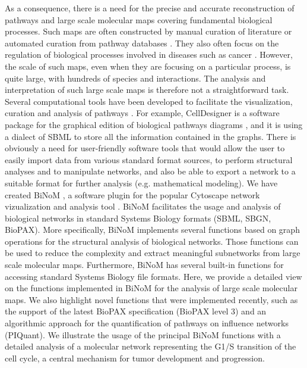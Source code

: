 \documentclass[10pt]{bmc_article}
\newenvironment{bmcformat}{\baselineskip20pt\sloppy\setboolean{publ}{false}}{\baselineskip20pt\sloppy}
\begin{document}
\begin{bmcformat}
As a consequence, there is a need for the precise and accurate reconstruction of
pathways and large scale molecular maps covering fundamental biological
processes. Such maps are often constructed by manual curation of literature or
automated curation from pathway databases \cite{bauer2009pathway}. They also
often focus on the regulation of biological processes involved in diseases such
as cancer \cite{oda2005comprehensive, oda2006comprehensive,
calzone2008comprehensive, caron2010comprehensive}. However, the scale of such
maps, even when they are focusing on a particular process, is quite large, with
hundreds of species and interactions. The analysis and interpretation of such
large scale maps is therefore not a straightforward task. Several computational
tools have been developed to facilitate the visualization, curation and analysis
of pathways \cite{adriaens2008public}. For example, CellDesigner is a software package
for the graphical edition of biological pathways diagrams
\cite{funahashi2003celldesigner}, and it is using a dialect
of SBML to store all the information contained in the graphs. There is obviously
a need for user-friendly software tools that would allow the user to easily
import data from various standard format sources, to perform structural analyses
and to manipulate networks, and also be able to export a network to a suitable
format for further analysis (e.g. mathematical modeling). We have created
BiNoM \cite{zinovyev2008binom}, a software plugin for the popular Cytoscape
network vizualization and analysis tool \cite{cline2007integration}. BiNoM
facilitates the usage and analysis of biological networks in standard Systems
Biology formats (SBML, SBGN, BioPAX). More specifically, BiNoM implements
several functions based on graph operations for the structural analysis of
biological networks. Those functions can be used to reduce the complexity and
extract meaningful subnetworks from large scale molecular maps. Furthermore,
BiNoM has several built-in functions for accessing standard Systems Biology file
formats. 
Here, we provide a detailed view on the functions implemented in BiNoM for the
analysis of large scale molecular maps. We also highlight novel functions that
were implemented recently, such as the support of the latest BioPAX
specification (BioPAX level 3) and an algorithmic approach for the
quantification of pathways on influence networks (PIQuant). We illustrate the
usage of the principal BiNoM functions with a detailed analysis of a molecular network
representing the G1/S transition of the cell cycle, a central mechanism for
tumor development and progression.


\end{bmcformat}
\end{document}
